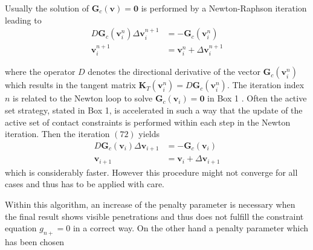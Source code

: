 Usually the solution of $ \mathbf{G}_{c}(\mathbf{v})=\mathbf{0} $ is performed by a Newton-Raphson iteration leading to
\begin{equation}
\label{eqn:4.72}
\begin{aligned}
D \mathbf{G}_{c}\left(\mathbf{v}_{i}^{n}\right) \Delta \mathbf{v}_{i}^{n+1} &=-\mathbf{G}_{c}\left(\mathbf{v}_{i}^{n}\right) \\
\mathbf{v}_{i}^{n+1} &=\mathbf{v}_{i}^{n}+\Delta \mathbf{v}_{i}^{n+1}
\end{aligned}
\end{equation}

where the operator $ D $ denotes the directional derivative of the vector $ \mathbf{G}_{c}\left(\mathbf{v}_{i}^{n}\right) $ which results in the tangent matrix $ \mathbf{K}_{T}\left(\mathbf{v}_{i}^{n}\right)=D \mathbf{G}_{c}\left(\mathbf{v}_{i}^{n}\right) $. The iteration index $ n $ is related to the Newton loop to solve $ \mathbf{G}_{c}\left(\mathbf{v}_{i}\right)=\mathbf{0} $ in Box 1 . Often the active set strategy, stated in Box 1, is accelerated in such a way that the update of the active set of contact constraints is performed within each step in the Newton iteration. Then the iteration $ (72) $ yields
\begin{equation}
\label{eqn:4.73}
 \begin{aligned} D \mathbf{G}_{c}\left(\mathbf{v}_{i}\right) \Delta \mathbf{v}_{i+1} &=-\mathbf{G}_{c}\left(\mathbf{v}_{i}\right) \\ \mathbf{v}_{i+1} &=\mathbf{v}_{i}+\Delta \mathbf{v}_{i+1} \end{aligned} 
\end{equation}
which is considerably faster. However this procedure might not converge for all cases and thus has to be applied with care.

Within this algorithm, an increase of the penalty parameter is necessary when the final result shows visible penetrations and thus does not fulfill the constraint equation $ g_{n+}=0 $ in a correct way. On the other hand a penalty parameter which has been chosen